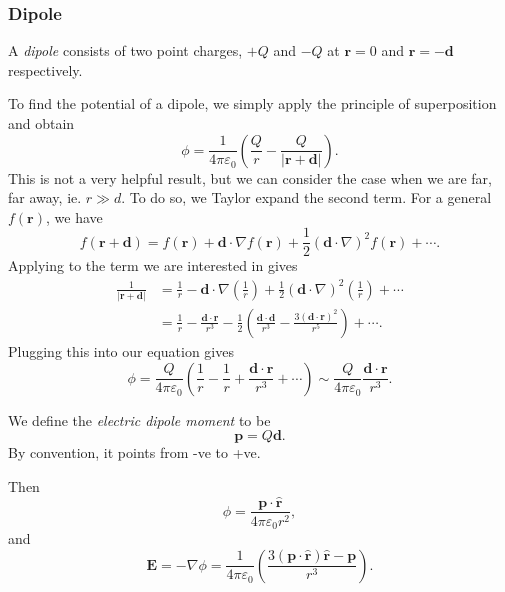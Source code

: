 \documentclass[a4paper]{article}
\begin{document}
\subsubsection{Dipole}
\begin{defi}[Dipole]
  A \emph{dipole} consists of two point charges, $+Q$ and $-Q$ at $\mathbf{r} = 0$ and $\mathbf{r} = -\mathbf{d}$ respectively.
\end{defi}

To find the potential of a dipole, we simply apply the principle of superposition and obtain
\[
  \phi = \frac{1}{4\pi\varepsilon_0}\left(\frac{Q}{r} - \frac{Q}{|\mathbf{r} + \mathbf{d}|}\right).
\]
This is not a very helpful result, but we can consider the case when we are far, far away, ie. $r \gg d$. To do so, we Taylor expand the second term. For a general $f(\mathbf{r})$, we have
\[
  f(\mathbf{r} + \mathbf{d}) = f(\mathbf{r}) + \mathbf{d}\cdot \nabla f(\mathbf{r}) + \frac{1}{2}(\mathbf{d}\cdot \nabla)^2f(\mathbf{r}) + \cdots.
\]
Applying to the term we are interested in gives
\begin{align*}
  \frac{1}{|\mathbf{r} + \mathbf{d}|} &= \frac{1}{r} - \mathbf{d}\cdot \nabla\left(\frac{1}{r}\right) + \frac{1}{2}(\mathbf{d}\cdot \nabla)^2\left(\frac{1}{r}\right) + \cdots\\
  &= \frac{1}{r} - \frac{\mathbf{d}\cdot \mathbf{r}}{r^3} - \frac{1}{2}\left(\frac{\mathbf{d}\cdot \mathbf{d}}{r^3} - \frac{3(\mathbf{d}\cdot \mathbf{r})^2}{r^5}\right) + \cdots.
\end{align*}
Plugging this into our equation gives
\[
  \phi = \frac{Q}{4\pi\varepsilon_0}\left(\frac{1}{r} - \frac{1}{r} + \frac{\mathbf{d}\cdot \mathbf{r}}{r^3} + \cdots\right) \sim \frac{Q}{4\pi\varepsilon_0} \frac{\mathbf{d}\cdot \mathbf{r}}{r^3}.
\]
\begin{defi}
  We define the \emph{electric dipole moment} to be
  \[
    \mathbf{p} = Q\mathbf{d}.
  \]
  By convention, it points from -ve to +ve.
\end{defi}
Then
\[
  \phi = \frac{\mathbf{p}\cdot \hat{\mathbf{r}}}{4\pi\varepsilon_0 r^2},
\]
and
\[
  \mathbf{E} = -\nabla\phi = \frac{1}{4\pi\varepsilon_0}\left(\frac{3(\mathbf{p}\cdot\hat{\mathbf{r}})\hat{\mathbf{r}} - \mathbf{p}}{r^3}\right).
\]
\end{document}
